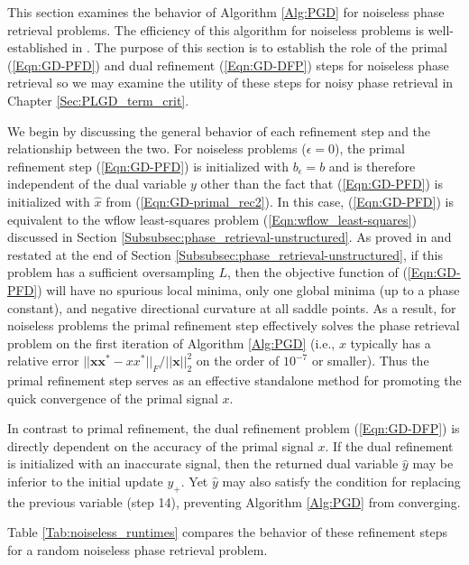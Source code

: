 This section examines the behavior of Algorithm \ref{Alg:PGD} for noiseless phase retrieval problems.  The efficiency of this algorithm for noiseless problems is well-established in \cite[Sections 5.1.1, 5.1.3]{DBLP:journals/siamsc/FriedlanderM16}.  The purpose of this section is to establish the role of the primal (\ref{Eqn:GD-PFD}) and dual refinement (\ref{Eqn:GD-DFP}) steps for noiseless phase retrieval so we may examine the utility of these steps for noisy phase retrieval in Chapter \ref{Sec:PLGD_term_crit}.

We begin by discussing the general behavior of each refinement step and the relationship between the two.  
For noiseless problems ($\epsilon = 0$), the primal refinement step (\ref{Eqn:GD-PFD}) is initialized with $b_\epsilon = b$ and is therefore independent of the dual variable $y$ other than the fact that (\ref{Eqn:GD-PFD}) is initialized with $\hat{x}$ from (\ref{Eqn:GD-primal_rec2}).  
In this case, (\ref{Eqn:GD-PFD}) is equivalent to the wflow least-squares problem (\ref{Eqn:wflow_least-squares}) discussed in Section \ref{Subsubsec:phase_retrieval-unstructured}.  As proved in \cite{sun2016geometric} and restated at the end of Section \ref{Subsubsec:phase_retrieval-unstructured}, if this problem has a sufficient oversampling $L$, then the objective function of (\ref{Eqn:GD-PFD}) will have no spurious local minima, only one global minima (up to a phase constant), and negative directional curvature at all saddle points.  As a result, for noiseless problems the primal refinement step effectively solves the phase retrieval problem on the first iteration of Algorithm \ref{Alg:PGD} (i.e., $x$ typically has a relative error $|| \mathbf{x}\mathbf{x}^* - xx^* ||_F / ||\mathbf{x}||_2^2$ on the order of $10^{-7}$ or smaller).  Thus the primal refinement step serves as an effective standalone method for promoting the quick convergence of the primal signal $x$.

In contrast to primal refinement, the dual refinement problem (\ref{Eqn:GD-DFP}) is directly dependent on the accuracy of the primal signal $x$.  If the dual refinement is initialized with an inaccurate signal, then the returned dual variable $\hat{y}$ may be inferior to the initial update $y_+$.  Yet $\hat{y}$ may also satisfy the condition for replacing the previous variable (step 14), preventing Algorithm \ref{Alg:PGD} from converging.

Table \ref{Tab:noiseless_runtimes} compares the behavior of these refinement steps for a random noiseless phase retrieval problem.


